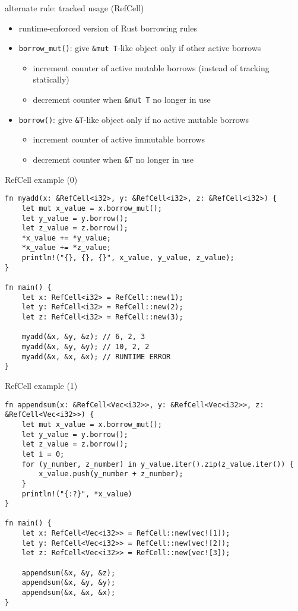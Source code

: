 \begin{frame}[fragile]{alternate rule: tracked usage (RefCell)}
    \begin{itemize}
    \item runtime-enforced version of Rust borrowing rules
    \item \texttt{borrow\_mut()}: give \verb|&mut T|-like object only if other active borrows
        \begin{itemize}
        \item increment counter of active mutable borrows (instead of tracking statically)
        \item decrement counter when \verb|&mut T| no longer in use 
        \end{itemize}
    \item \texttt{borrow()}: give \verb|&T|-like object only if no active mutable borrows
        \begin{itemize}
        \item increment counter of active immutable borrows
        \item decrement counter when \verb|&T| no longer in use
        \end{itemize}
    \end{itemize}
\end{frame}

\begin{frame}[fragile]{RefCell example (0)}
\begin{verbatim}
fn myadd(x: &RefCell<i32>, y: &RefCell<i32>, z: &RefCell<i32>) {
    let mut x_value = x.borrow_mut();
    let y_value = y.borrow();
    let z_value = z.borrow();
    *x_value += *y_value;
    *x_value += *z_value;
    println!("{}, {}, {}", x_value, y_value, z_value);
}

fn main() {
    let x: RefCell<i32> = RefCell::new(1);
    let y: RefCell<i32> = RefCell::new(2);
    let z: RefCell<i32> = RefCell::new(3);
    
    myadd(&x, &y, &z); // 6, 2, 3
    myadd(&x, &y, &y); // 10, 2, 2
    myadd(&x, &x, &x); // RUNTIME ERROR
}
\end{verbatim}
\end{frame}

\begin{frame}[fragile]{RefCell example (1)}
\begin{verbatim}
fn appendsum(x: &RefCell<Vec<i32>>, y: &RefCell<Vec<i32>>, z: &RefCell<Vec<i32>>) {
    let mut x_value = x.borrow_mut();
    let y_value = y.borrow();
    let z_value = z.borrow();
    let i = 0;
    for (y_number, z_number) in y_value.iter().zip(z_value.iter()) {
        x_value.push(y_number + z_number);
    }
    println!("{:?}", *x_value)
}

fn main() {
    let x: RefCell<Vec<i32>> = RefCell::new(vec![1]);
    let y: RefCell<Vec<i32>> = RefCell::new(vec![2]);
    let z: RefCell<Vec<i32>> = RefCell::new(vec![3]);
    
    appendsum(&x, &y, &z);
    appendsum(&x, &y, &y);
    appendsum(&x, &x, &x);
}
\end{verbatim}
\end{frame}


